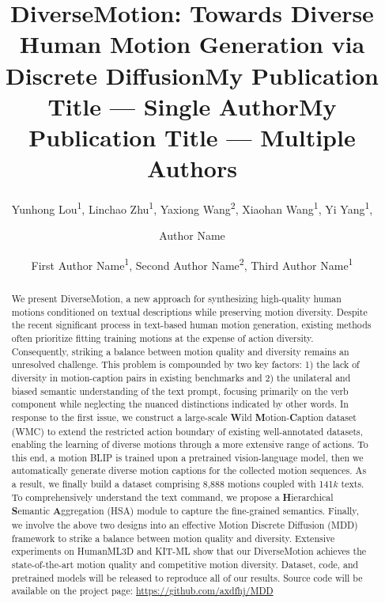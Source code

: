 \documentclass[letterpaper]{article} \usepackage{aaai24}
\title{DiverseMotion: Towards Diverse Human Motion Generation via\\ Discrete Diffusion}
\author{
    Yunhong Lou\textsuperscript{\rm 1},
    Linchao Zhu\textsuperscript{\rm 1},
    Yaxiong Wang\textsuperscript{\rm 2},
    Xiaohan Wang\textsuperscript{\rm 1},
    Yi Yang\textsuperscript{\rm 1},
}
\title{My Publication Title --- Single Author}
\author {
    Author Name
}
\title{My Publication Title --- Multiple Authors}
\author {
First Author Name\textsuperscript{\rm 1},
    Second Author Name\textsuperscript{\rm 2},
    Third Author Name\textsuperscript{\rm 1}
}
\begin{document}
\maketitle

\begin{abstract}
We present DiverseMotion, a new approach for synthesizing high-quality human motions conditioned on textual descriptions while preserving motion diversity. 
Despite the recent significant process in text-based human motion generation,
existing methods often prioritize fitting training motions at the expense of action diversity. Consequently, striking a balance between motion quality and diversity remains an unresolved challenge. 
This problem is compounded by two key factors: 1) the lack of diversity in motion-caption pairs in existing benchmarks and 2) the unilateral and biased semantic understanding of the text prompt, focusing primarily on the verb component while neglecting the nuanced distinctions  indicated by other words.
In response to the first issue, we construct a large-scale \textbf{W}ild \textbf{M}otion-\textbf{C}aption  dataset (WMC) to extend the restricted action boundary of existing well-annotated datasets, enabling the learning of diverse motions through a more extensive range of actions. 
To this end, a motion BLIP is trained upon a pretrained vision-language model, then we automatically generate diverse motion captions for the collected motion sequences. As a result, we finally build a dataset comprising 8,888 motions coupled with 141$k$ texts.
To comprehensively understand the text command, we propose a \textbf{H}ierarchical \textbf{S}emantic \textbf{A}ggregation (HSA) module to capture the fine-grained semantics.
Finally,
we involve the above two designs into an effective Motion Discrete Diffusion (MDD) framework  to strike a balance between motion quality and diversity. 
Extensive experiments on HumanML3D and KIT-ML show that our DiverseMotion achieves the state-of-the-art motion quality and competitive motion diversity. Dataset, code, and pretrained models will be released to reproduce all of our results.
Source code will be available on the project page: \url{https://github.com/axdfhj/MDD}







\end{abstract}
\end{document}
